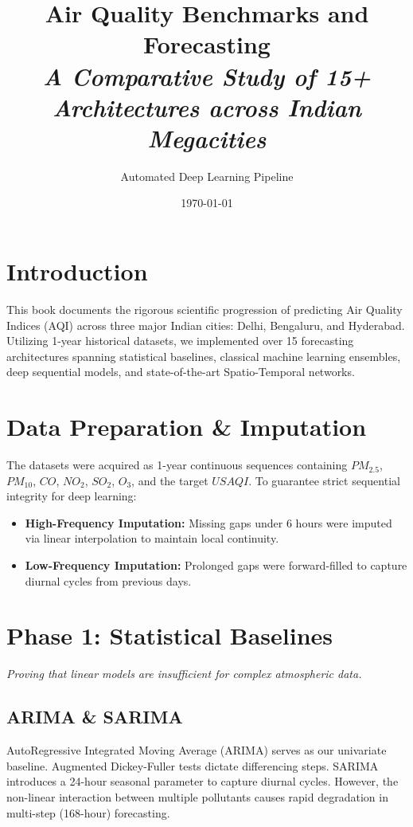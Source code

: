 \documentclass[11pt,a4paper,oneside]{book}
\title{
    \Huge\textbf{Air Quality Benchmarks and Forecasting}\\
    \vspace{0.5cm}
    \Large\textit{A Comparative Study of 15+ Architectures across Indian Megacities}
}
\author{Automated Deep Learning Pipeline}
\date{\today}
\begin{document}
\maketitle
\tableofcontents

\chapter{Introduction}
This book documents the rigorous scientific progression of predicting Air Quality Indices (AQI) across three major Indian cities: Delhi, Bengaluru, and Hyderabad. Utilizing 1-year historical datasets, we implemented over 15 forecasting architectures spanning statistical baselines, classical machine learning ensembles, deep sequential models, and state-of-the-art Spatio-Temporal networks.

\chapter{Data Preparation \& Imputation}
The datasets were acquired as 1-year continuous sequences containing $PM_{2.5}$, $PM_{10}$, $CO$, $NO_2$, $SO_2$, $O_3$, and the target $US AQI$. To guarantee strict sequential integrity for deep learning:
\begin{itemize}
    \item \textbf{High-Frequency Imputation:} Missing gaps under 6 hours were imputed via linear interpolation to maintain local continuity.
    \item \textbf{Low-Frequency Imputation:} Prolonged gaps were forward-filled to capture diurnal cycles from previous days.
\end{itemize}

\chapter{Phase 1: Statistical Baselines}
\textit{Proving that linear models are insufficient for complex atmospheric data.}

\section{ARIMA \& SARIMA}
AutoRegressive Integrated Moving Average (ARIMA) serves as our univariate baseline. Augmented Dickey-Fuller tests dictate differencing steps. SARIMA introduces a 24-hour seasonal parameter to capture diurnal cycles. However, the non-linear interaction between multiple pollutants causes rapid degradation in multi-step (168-hour) forecasting.
\end{document}
